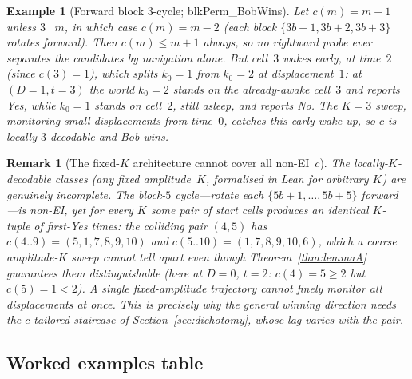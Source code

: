 \documentclass{article}
\newtheorem{remark}[theorem]{Remark}
\newtheorem{example}[theorem]{Example}
\newcommand{\Yes}{\textsf{Yes}}
\newcommand{\No}{\textsf{No}}
\newcommand{\us}{\discretionary{}{}{}\_\discretionary{}{}{}}
\newcommand{\lean}[1]{{\small\ttfamily #1}}
\begin{document}
\begin{example}[Forward block $3$-cycle; \lean{blkPerm\us BobWins}]\label{ex:blk}
Let $c(m)=m+1$ unless $3\mid m$, in which case $c(m)=m-2$ (each block
$\{3b{+}1,3b{+}2,3b{+}3\}$ rotates forward). Then $c(m)\le m+1$ always, so
\emph{no} rightward probe ever separates the candidates by navigation
alone. But cell~$3$ wakes early, at time~$2$ (since $c(3)=1$), which
splits $k_0=1$ from $k_0=2$ at displacement~$1$: at $(D{=}1,t{=}3)$ the
world $k_0=2$ stands on the already-awake cell~$3$ and reports \Yes, while
$k_0=1$ stands on cell~$2$, still asleep, and reports \No. The $K{=}3$
sweep, monitoring small displacements from time~$0$, catches this early
wake-up, so $c$ is locally $3$-decodable and Bob wins.
\end{example}

\begin{remark}[The fixed-$K$ architecture cannot cover all non-EI~$c$]
\label{rem:k5fail}
The locally-$K$-decodable classes (any fixed amplitude~$K$, formalised in
Lean for arbitrary $K$) are genuinely incomplete. The \emph{block-$5$
cycle}---rotate each $\{5b{+}1,\dots,5b{+}5\}$ forward---is non-EI, yet for
\emph{every} $K$ some pair of start cells produces an identical
$K$-tuple of first-\Yes{} times: the colliding pair $(4,5)$ has
$c(4..9)=(5,1,7,8,9,10)$ and $c(5..10)=(1,7,8,9,10,6)$, which a coarse
amplitude-$K$ sweep cannot tell apart even though Theorem~\ref{thm:lemmaA}
guarantees them distinguishable (here at $D{=}0$, $t{=}2$: $c(4)=5\ge 2$
but $c(5)=1<2$). A single fixed-amplitude trajectory cannot finely monitor
all displacements at once. This is precisely why the general winning
direction needs the $c$-tailored staircase of Section~\ref{sec:dichotomy},
whose lag varies with the pair.
\end{remark}

\subsection{Worked examples table}
\label{sec:table}
\end{document}
